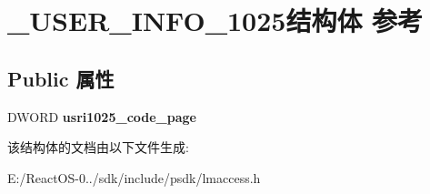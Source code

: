 \hypertarget{struct___u_s_e_r___i_n_f_o__1025}{}\section{\+\_\+\+U\+S\+E\+R\+\_\+\+I\+N\+F\+O\+\_\+1025结构体 参考}
\label{struct___u_s_e_r___i_n_f_o__1025}
\subsection*{Public 属性}
\begin{DoxyCompactItemize}
\item 
\mbox{\label{struct___u_s_e_r___i_n_f_o__1025_a72952a6975acbdf701b9e79ea10f1660}} 
D\+W\+O\+RD {\bfseries usri1025\+\_\+code\+\_\+page}
\end{DoxyCompactItemize}


该结构体的文档由以下文件生成\+:\begin{DoxyCompactItemize}
\item 
E\+:/\+React\+O\+S-\/0../sdk/include/psdk/lmaccess.\+h\end{DoxyCompactItemize}
